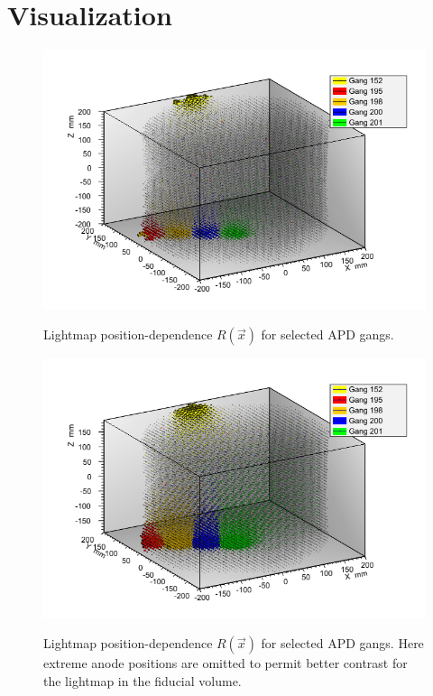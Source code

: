 \section{Visualization} \label{sec:LightmapVisualization}

\begin{figure}
\begin{center}
\includegraphics[keepaspectratio=true,width=\textwidth]{Lightmap_viz.png}
\end{center}
\renewcommand{\baselinestretch}{1}
\small\normalsize
\begin{quote}
\caption{Lightmap position-dependence $R(\vec{x})$ for selected APD gangs.}
\label{fig:Lightmap3DPlot_unzoomed}
\end{quote}
\end{figure}
\renewcommand{\baselinestretch}{2}
\small\normalsize

\begin{figure}
\begin{center}
\includegraphics[keepaspectratio=true,width=\textwidth]{Lightmap_viz_zoom.png}
\end{center}
\renewcommand{\baselinestretch}{1}
\small\normalsize
\begin{quote}
\caption{Lightmap position-dependence $R(\vec{x})$ for selected APD gangs.  Here extreme anode positions are omitted to permit better contrast for the lightmap in the fiducial volume.}
\label{fig:Lightmap3DPlot_zoomed}
\end{quote}
\end{figure}
\renewcommand{\baselinestretch}{2}
\small\normalsize

